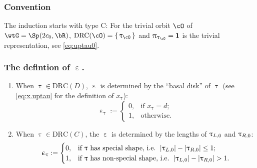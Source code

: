 \documentclass[12pt,a4paper]{amsart}
\newcommand{\bfone}{\mathbf{1}}
\def\abs#1{\left|{#1}\right|}
\numberwithin{equation}{section}
\theoremstyle{remark}
\def\drc{\mathrm{DRC}}
\def\uptaup{\uptau^{\prime}}
\begin{document}
\subsubsection{Convention}
The induction starts with type C: For the trivial orbit $\cO$ of
$\wtG = \Sp(2c_{0},\bR)$, $\drc(\cO) = \set{\uptau_{\cO}}$ and
$\uppi_{\uptau_{\cO}}=\bfone$ is the trivial representation, see \eqref{eq:uptau0}.

\subsubsection{The defintion of $\upepsilon$.} \label{sec:upepsilon}
\begin{enumerate}[label=(\arabic*).,series=alg1]
  \item When $\uptau\in \drc(D)$, $\upepsilon$ is determined by the ``basal
  disk'' of $\uptau$ (see \eqref{eq:x.uptau} for the definition of $x_{\uptau}$):%
  \[
    \upepsilon_{\uptau}:=
    \begin{cases}
      0, & \text{if $x_{\uptau}=d$;} \\
      1, & \text{otherwise.}
    \end{cases}
  \]
  \item When $\uptau\in \drc(C)$, the  $\upepsilon$  is determined by
  the lengths of $\uptau_{L,0}$ and $\uptau_{R,0}$:
  \[
    \upepsilon_{\uptau} :=
    \begin{cases}
      0, & \text{if $\uptau$ has special shape, i.e. } \abs{\taulf}-\abs{\taurf} \leq  1;\\
      1, & \text{if $\uptau$ has non-special shape, i.e. }\abs{\taulf} - \abs{\taurf}> 1.
    \end{cases}
  \]
\end{enumerate}

\medskip

\end{document}
